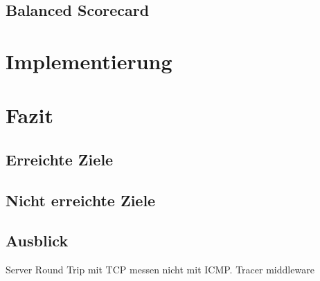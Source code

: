 \section{Balanced Scorecard}
\chapter{Implementierung}

\chapter{Fazit}
\section{Erreichte Ziele}
\section{Nicht erreichte Ziele}
\section{Ausblick}
Server Round Trip mit TCP messen nicht mit ICMP. Tracer middleware

